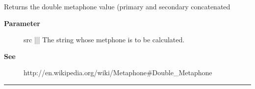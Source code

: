 \par
Returns the double metaphone value (primary and secondary concatenated

\par
\begin{description}
\item [\textbf{Parameter}] src ||| The string whose metphone is to be calculated.
\item [\textbf{See}] http://en.wikipedia.org/wiki/Metaphone\#Double\_Metaphone
\end{description}

\rule{\linewidth}{0.5pt}


